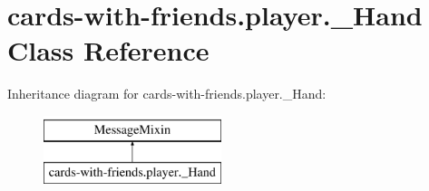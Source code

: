 \hypertarget{classcards-with-friends_1_1player_1_1___hand}{\section{cards-\/with-\/friends.player.\-\_\-\-Hand Class Reference}
\label{classcards-with-friends_1_1player_1_1___hand}
}
Inheritance diagram for cards-\/with-\/friends.player.\-\_\-\-Hand\-:\begin{figure}[H]
\begin{center}
\leavevmode
\includegraphics[height=2.000000cm]{classcards-with-friends_1_1player_1_1___hand}
\end{center}
\end{figure}
